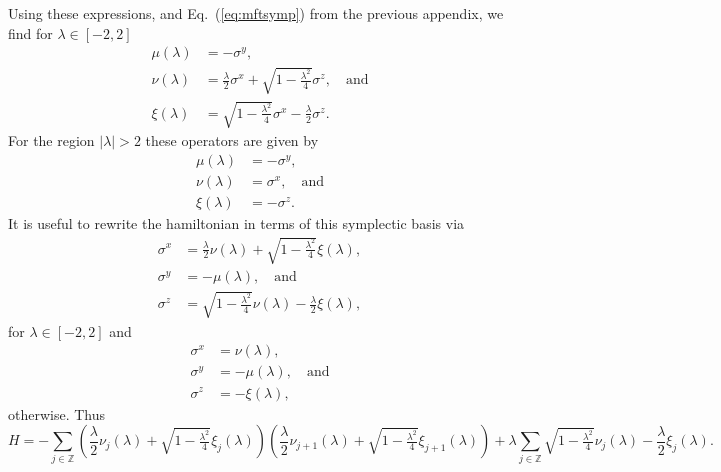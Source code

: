 \documentclass[prl,twocolumn,lengthcheck,superscriptaddress]{revtex4-1}
\theoremstyle{definition}
\theoremstyle{remark}
\begin{document}
Using these expressions, and Eq.~(\ref{eq:mftsymp}) from the previous appendix, we find for $\lambda \in [-2, 2]$
\begin{equation}
	\begin{split}
		\mu(\lambda) &=  -\sigma^y, \\
		\nu(\lambda) &= \frac{\lambda}{2} \sigma^x+  \sqrt{1-\tfrac{\lambda^2}{4}}\sigma^z,\quad \text{and}\\
		\xi(\lambda) &= \sqrt{1-\tfrac{\lambda^2}{4}}\sigma^x -  \frac{\lambda}{2} \sigma^z.
	\end{split}
\end{equation}
For the region $|\lambda| > 2$ these operators are given by
\begin{equation}
	\begin{split}
		\mu(\lambda) &=  -\sigma^y, \\
		\nu(\lambda) &=  \sigma^x,\quad \text{and}\\
		\xi(\lambda) &=  -  \sigma^z.
	\end{split}
\end{equation}
It is useful to rewrite the hamiltonian in terms of this symplectic basis via 
\begin{equation}
	\begin{split}
		\sigma^x &= \frac{\lambda}{2}\nu(\lambda) +  \sqrt{1-\tfrac{\lambda^2}{4}}\xi(\lambda),\\
		\sigma^y &=  -\mu(\lambda), \quad \text{and}\\
		\sigma^z &= \sqrt{1-\tfrac{\lambda^2}{4}}\nu(\lambda) -  \frac{\lambda}{2} \xi(\lambda),
	\end{split}
\end{equation}
for $\lambda \in [-2, 2]$ and 
\begin{equation}
	\begin{split}
		\sigma^x &=\nu(\lambda) , \\
		\sigma^y &=  -\mu(\lambda),\quad \text{and}\\
		\sigma^z &=  -\xi(\lambda),
	\end{split}
\end{equation}
otherwise.
Thus
\begin{equation}
	H = -\sum_{j\in\mathbb{Z}} \left(\frac{\lambda}{2}\nu_j(\lambda) +  \sqrt{1-\tfrac{\lambda^2}{4}}\xi_j(\lambda)\right)\left(\frac{\lambda}{2}\nu_{j+1}(\lambda) +  \sqrt{1-\tfrac{\lambda^2}{4}}\xi_{j+1}(\lambda)\right)  + \lambda\sum_{j\in\mathbb{Z}} \sqrt{1-\tfrac{\lambda^2}{4}}\nu_j(\lambda) -  \frac{\lambda}{2} \xi_j(\lambda).
\end{equation}
\end{document}
